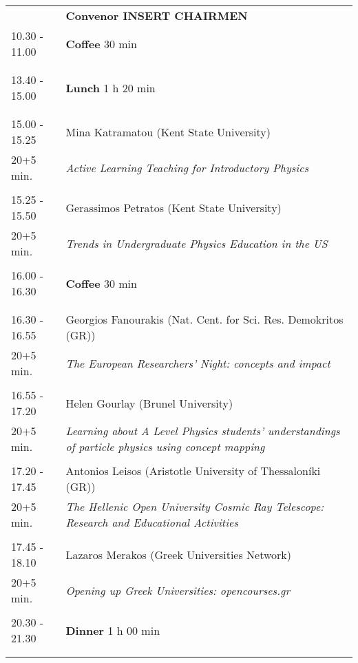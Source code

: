 \begin{longtable}{p{3cm}p{13cm}}
&\hfill {\bf Convenor INSERT CHAIRMEN }\\ 
10.30 - 11.00 & {\bf Coffee} \hfill 30 min \\ 
 & \\ 
 & \\ 
13.40 - 15.00 & {\bf Lunch} \hfill 1 h 20 min \\ 
 & \\ 
 & \\ 
15.00 - 15.25 & Mina Katramatou (Kent State University)\\ 
20+5 min. & {\it Active Learning Teaching for Introductory Physics}\\ 
 & \\ 
15.25 - 15.50 & Gerassimos Petratos (Kent State University)\\ 
20+5 min. & {\it Trends in Undergraduate Physics Education in the US}\\ 
 & \\ 
16.00 - 16.30 & {\bf Coffee} \hfill 30 min \\ 
 & \\ 
 & \\ 
16.30 - 16.55 & Georgios Fanourakis (Nat. Cent. for Sci. Res. Demokritos (GR))\\ 
20+5 min. & {\it The European Researchers' Night: concepts and impact}\\ 
 & \\ 
16.55 - 17.20 & Helen Gourlay (Brunel University)\\ 
20+5 min. & {\it Learning about A Level Physics students’ understandings of particle physics using concept mapping}\\ 
 & \\ 
17.20 - 17.45 & Antonios Leisos (Aristotle University of Thessaloníki (GR))\\ 
20+5 min. & {\it The Hellenic Open University Cosmic Ray Telescope: Research and Educational Activities}\\ 
 & \\ 
17.45 - 18.10 & Lazaros Merakos (Greek Universities Network)\\ 
20+5 min. & {\it Opening up Greek Universities: opencourses.gr}\\ 
 & \\ 
20.30 - 21.30 & {\bf Dinner} \hfill 1 h 00 min \\ 
 & \\ 
 & \\ 
\end{longtable}

